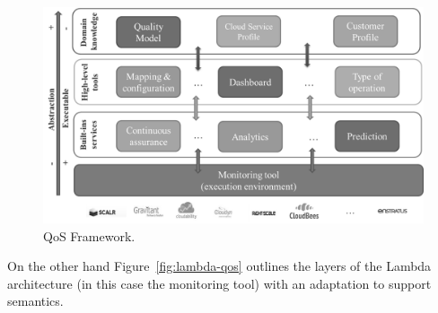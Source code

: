 \begin{figure}[!ht]
\centering
	\includegraphics[width=12cm]{./imgs/qos-framework}
 \caption{QoS Framework.}
 \label{fig:qos-framework}
\end{figure}

On the other hand Figure~\ref{fig:lambda-qos} outlines the layers of the Lambda architecture (in this case the monitoring tool) with 
an adaptation to support semantics. 


